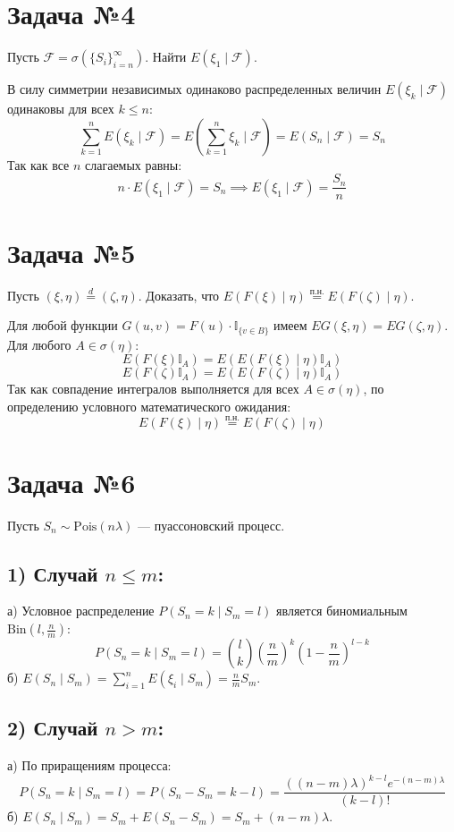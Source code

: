\documentclass[12pt]{article}
\begin{document}
\bigskip
\section*{Задача №4}
Пусть $\mathcal{F} = \sigma(\{S_i\}_{i=n}^\infty)$. Найти $E(\xi_1 \mid \mathcal{F})$.

В силу симметрии независимых одинаково распределенных величин $E(\xi_k \mid \mathcal{F})$ одинаковы для всех $k \le n$:
\[
\sum_{k=1}^n E(\xi_k \mid \mathcal{F}) = E\left(\sum_{k=1}^n \xi_k \mid \mathcal{F}\right) = E(S_n \mid \mathcal{F}) = S_n
\]
Так как все $n$ слагаемых равны:
\[
n \cdot E(\xi_1 \mid \mathcal{F}) = S_n \implies E(\xi_1 \mid \mathcal{F}) = \frac{S_n}{n}
\]

\bigskip
\section*{Задача №5}
Пусть $(\xi, \eta) \stackrel{d}{=} (\zeta, \eta)$. Доказать, что $E(F(\xi) \mid \eta) \stackrel{\text{п.н.}}{=} E(F(\zeta) \mid \eta)$.

Для любой функции $G(u,v) = F(u) \cdot \mathbb{I}_{\{v \in B\}}$ имеем $E G(\xi, \eta) = E G(\zeta, \eta)$.
Для любого $A \in \sigma(\eta)$:
\[
E(F(\xi) \mathbb{I}_A) = E(E(F(\xi) \mid \eta) \mathbb{I}_A)
\]
\[
E(F(\zeta) \mathbb{I}_A) = E(E(F(\zeta) \mid \eta) \mathbb{I}_A)
\]
Так как совпадение интегралов выполняется для всех $A \in \sigma(\eta)$, по определению условного математического ожидания:
\[
E(F(\xi) \mid \eta) \stackrel{\text{п.н.}}{=} E(F(\zeta) \mid \eta)
\]

\bigskip
\section*{Задача №6}
Пусть $S_n \sim \text{Pois}(n\lambda)$ — пуассоновский процесс.

\subsection*{1) Случай $n \le m$:}
а) Условное распределение $P(S_n = k \mid S_m = l)$ является биномиальным $\text{Bin}\left(l, \frac{n}{m}\right)$:
\[
P(S_n = k \mid S_m = l) = \binom{l}{k} \left(\frac{n}{m}\right)^k \left(1 - \frac{n}{m}\right)^{l-k}
\]
б) $E(S_n \mid S_m) = \sum_{i=1}^n E(\xi_i \mid S_m) = \frac{n}{m} S_m$.

\subsection*{2) Случай $n > m$:}
а) По приращениям процесса:
\[
P(S_n = k \mid S_m = l) = P(S_n - S_m = k - l) = \frac{((n-m)\lambda)^{k-l} e^{-(n-m)\lambda}}{(k-l)!}
\]
б) $E(S_n \mid S_m) = S_m + E(S_n - S_m) = S_m + (n-m)\lambda$.
\end{document}
